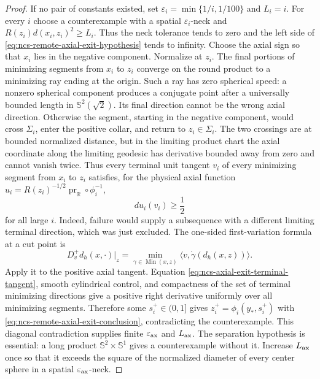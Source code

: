 \documentclass[10pt]{coll-l}
\newcommand{\Sph}{\mathbb{S}}
\theoremstyle{definition}
\theoremstyle{remark}
\numberwithin{section}{chapter}
\numberwithin{equation}{chapter}
\begin{document}
\begin{proof}
If no pair of constants existed, set
$\varepsilon_i=\min\{1/i,1/100\}$ and $L_i=i$.  For every $i$ choose a
counterexample with a spatial $\varepsilon_i$-neck and
$R(z_i)d(x_i,z_i)^2\geq L_i$.  Thus the neck tolerance tends to zero and
the left side of \eqref{eq:ncs-remote-axial-exit-hypothesis} tends to
infinity.  Choose the
axial sign so that $x_i$ lies in the negative component.  Normalize at
$z_i$.  The final portions of minimizing segments from $x_i$ to $z_i$
converge on the round product to a minimizing ray ending at the origin.
Such a ray has zero spherical speed: a nonzero spherical component
produces a conjugate point after a universally bounded length in
$\Sph^2(\sqrt2)$.  Its final direction cannot be the wrong axial
direction.  Otherwise the segment, starting in the negative component,
would cross $\Sigma_i$, enter the positive collar, and return to
$z_i\in\Sigma_i$.  The two crossings are at bounded normalized distance,
but in the limiting product chart the axial coordinate along the limiting
geodesic has derivative bounded away from zero and cannot vanish twice.
Thus every terminal unit tangent $v_i$ of every minimizing segment from
$x_i$ to $z_i$ satisfies, for the physical axial function
$u_i=R(z_i)^{-1/2}\operatorname{pr}_{\mathbb R}\circ\phi_i^{-1}$,
\begin{equation}
                              du_i(v_i)\geq\frac12                 \label{eq:ncs-axial-exit-terminal-tangent}
\end{equation}
for all large $i$.  Indeed, failure would supply a subsequence with a
different limiting terminal direction, which was just excluded.  The
one-sided first-variation formula at a cut point is
\begin{equation}
 D^+_v d_h(x,\cdot)\big|_z
   =\min_{\gamma\in\operatorname{Min}(x,z)}
          \langle v,\dot\gamma(d_h(x,z))\rangle .     \label{eq:ncs-distance-directional-derivative}
\end{equation}
Apply it to the positive axial tangent.  Equation
\eqref{eq:ncs-axial-exit-terminal-tangent}, smooth cylindrical control,
and compactness of the set of terminal minimizing directions give a
positive right derivative uniformly over all minimizing segments.
Therefore some $s_i^+\in(0,1]$ gives $z_i^+=\phi_i(y_*,s_i^+)$ with
\eqref{eq:ncs-remote-axial-exit-conclusion}, contradicting the
counterexample.  This diagonal contradiction supplies finite
$\varepsilon_{\rm ax}$ and $L_{\rm ax}$.  The separation hypothesis is
essential: a long product $\Sph^2\times\Sph^1$ gives a counterexample
without it.
Increase $L_{\rm ax}$ once so that it exceeds the square of the normalized
diameter of every center sphere in a spatial
$\varepsilon_{\rm ax}$-neck.
\end{proof}
\end{document}
